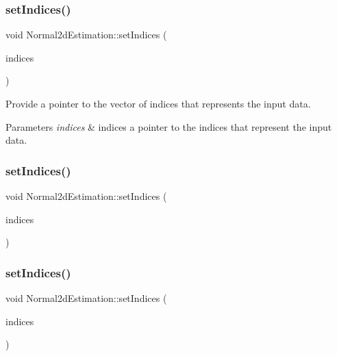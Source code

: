 \subsubsection{\texorpdfstring{set\+Indices()}{setIndices()}\hspace{0.1cm}{\footnotesize\ttfamily [2/4]}}
{\footnotesize\ttfamily void Normal2d\+Estimation\+::set\+Indices (\begin{DoxyParamCaption}\item[{const pcl\+::\+Point\+Indices\+::\+Const\+Ptr \&}]{indices }\end{DoxyParamCaption})}



Provide a pointer to the vector of indices that represents the input data. 


\begin{DoxyParams}{Parameters}
{\em indices} & indices a pointer to the indices that represent the input data. \\
\hline
\end{DoxyParams}
\mbox{\label{classNormal2dEstimation_a91bb44f43f09aa33f3c447cfe2cde6b3}} 
\subsubsection{\texorpdfstring{set\+Indices()}{setIndices()}\hspace{0.1cm}{\footnotesize\ttfamily [3/4]}}
{\footnotesize\ttfamily void Normal2d\+Estimation\+::set\+Indices (\begin{DoxyParamCaption}\item[{const pcl\+::\+Point\+Indices\+::\+Ptr \&}]{indices }\end{DoxyParamCaption})\hspace{0.3cm}{\ttfamily [inline]}}

\mbox{\label{classNormal2dEstimation_a57a561d5d51d42584687dd4a3d29defd}} 
\subsubsection{\texorpdfstring{set\+Indices()}{setIndices()}\hspace{0.1cm}{\footnotesize\ttfamily [4/4]}}
{\footnotesize\ttfamily void Normal2d\+Estimation\+::set\+Indices (\begin{DoxyParamCaption}\item[{const pcl\+::\+Point\+Indices\+::\+Const\+Ptr \&}]{indices }\end{DoxyParamCaption})\hspace{0.3cm}{\ttfamily [inline]}}

